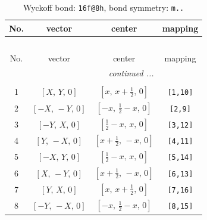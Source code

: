 \documentclass[fleqn,8pt]{jsarticle}
\begin{document}
\begin{longtable}{cccc}
\caption{Wyckoff bond: {\tt 16f@8h}, bond symmetry: {\tt m..}}
 \\
 \hline \hline
No. & vector & center & mapping \\ \hline \endfirsthead

\multicolumn{3}{l}{\tablename\ \thetable{}} \\
 \hline \hline
No. & vector & center & mapping \\ \hline \endhead

 \hline \hline
\multicolumn{3}{r}{\footnotesize\it continued ...} \\ \endfoot

 \hline \hline
\multicolumn{3}{r}{} \\ \endlastfoot

1 & $\left[ X,\, Y,\, 0 \right]$ & $\left[ x,\, x + \frac{1}{2},\, 0 \right]$ & {\tt [1,10]} \\ \hline
2 & $\left[ - X,\, - Y,\, 0 \right]$ & $\left[ - x,\, \frac{1}{2} - x,\, 0 \right]$ & {\tt [2,9]} \\ \hline
3 & $\left[ - Y,\, X,\, 0 \right]$ & $\left[ \frac{1}{2} - x,\, x,\, 0 \right]$ & {\tt [3,12]} \\ \hline
4 & $\left[ Y,\, - X,\, 0 \right]$ & $\left[ x + \frac{1}{2},\, - x,\, 0 \right]$ & {\tt [4,11]} \\ \hline
5 & $\left[ - X,\, Y,\, 0 \right]$ & $\left[ \frac{1}{2} - x,\, x,\, 0 \right]$ & {\tt [5,14]} \\ \hline
6 & $\left[ X,\, - Y,\, 0 \right]$ & $\left[ x + \frac{1}{2},\, - x,\, 0 \right]$ & {\tt [6,13]} \\ \hline
7 & $\left[ Y,\, X,\, 0 \right]$ & $\left[ x,\, x + \frac{1}{2},\, 0 \right]$ & {\tt [7,16]} \\ \hline
8 & $\left[ - Y,\, - X,\, 0 \right]$ & $\left[ - x,\, \frac{1}{2} - x,\, 0 \right]$ & {\tt [8,15]} \\
\end{longtable}
\renewcommand{\arraystretch}{1.2}
\end{document}
